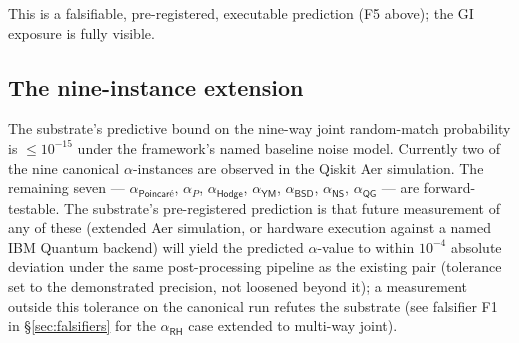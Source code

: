 \documentclass[11pt,a4paper]{amsart}
\theoremstyle{plain}
\theoremstyle{definition}
\begin{document}
This is a falsifiable, pre-registered, executable prediction (F5 above); the GI exposure is fully visible.

\subsection{The nine-instance extension}

The substrate's predictive bound on the nine-way joint random-match probability is $\le 10^{-15}$ under the framework's named baseline noise model. Currently two of the nine canonical $\alpha$-instances are observed in the Qiskit Aer simulation. The remaining seven --- $\alpha_{\textsf{Poincar\'e}}$, $\alpha_{P}$, $\alpha_{\textsf{Hodge}}$, $\alpha_{\textsf{YM}}$, $\alpha_{\textsf{BSD}}$, $\alpha_{\textsf{NS}}$, $\alpha_{\textsf{QG}}$ --- are forward-testable. The substrate's pre-registered prediction is that future measurement of any of these (extended Aer simulation, or hardware execution against a named IBM Quantum backend) will yield the predicted $\alpha$-value to within $10^{-4}$ absolute deviation under the same post-processing pipeline as the existing pair (tolerance set to the demonstrated precision, not loosened beyond it); a measurement outside this tolerance on the canonical run refutes the substrate (see falsifier F1 in \S\ref{sec:falsifiers} for the $\alpha_{\textsf{RH}}$ case extended to multi-way joint).
\end{document}
